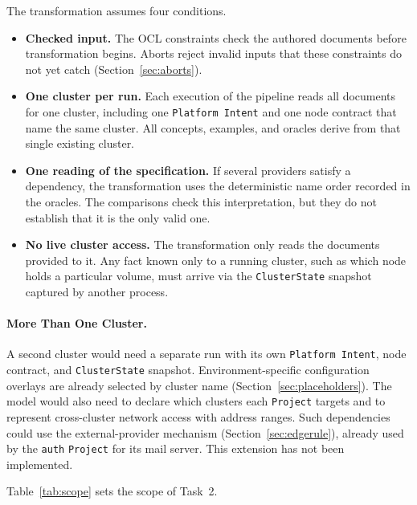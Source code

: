 The transformation assumes four conditions.

\begin{itemize}
  \item \textbf{Checked input.} The OCL constraints check the authored documents
    before transformation begins. Aborts reject invalid inputs that these
    constraints do not yet catch (Section~\ref{sec:aborts}).
  \item \textbf{One cluster per run.} Each execution of the pipeline reads
    all documents for one cluster, including one \texttt{Platform Intent}
    and one node contract that name the same cluster. All concepts,
    examples, and oracles derive from that single existing cluster.
  \item \textbf{One reading of the specification.} If several providers
    satisfy a dependency, the transformation uses the deterministic name
    order recorded in the oracles. The comparisons check this interpretation, but
    they do not establish that it is the only valid one.
  \item \textbf{No live cluster access.} The transformation only reads the
    documents provided to it. Any fact known only to a running cluster, such
    as which node holds a particular volume, must arrive via the
    \texttt{ClusterState} snapshot captured by another process.
\end{itemize}

\paragraph{More Than One Cluster.} A second cluster would need a separate
run with its own \texttt{Platform Intent}, node contract, and
\texttt{ClusterState} snapshot. Environment-specific configuration overlays are already selected
by cluster name (Section~\ref{sec:placeholders}). The model would also need
to declare which clusters each \texttt{Project} targets and to represent
cross-cluster network access with address ranges. Such dependencies could
use the external-provider mechanism (Section~\ref{sec:edgerule}), already used by the \texttt{auth} \texttt{Project} for its
mail server. This extension has not been implemented.

Table~\ref{tab:scope} sets the scope of Task~2.

